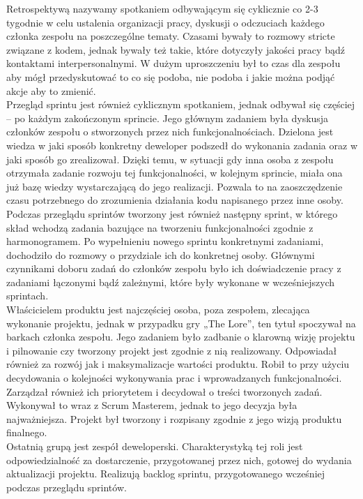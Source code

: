 \documentclass[oneside,polski,logo]{amuthesis}
\begin{document}
Retrospektywą nazywamy spotkaniem odbywającym się cyklicznie co 2-3 tygodnie w celu ustalenia organizacji pracy, dyskusji o odczuciach każdego członka zespołu na poszczególne tematy. Czasami bywały to rozmowy stricte związane z kodem, jednak bywały też takie, które dotyczyły jakości pracy bądź kontaktami interpersonalnymi. W dużym uproszczeniu był to czas dla zespołu aby mógł przedyskutować to co się podoba, nie podoba i jakie można podjąć akcje aby to zmienić. \\

Przegląd sprintu jest również cyklicznym spotkaniem, jednak odbywał się częściej – po każdym zakończonym sprincie. Jego głównym zadaniem była dyskusja członków zespołu o stworzonych przez nich funkcjonalnościach. Dzielona jest wiedza w jaki sposób konkretny deweloper podszedł do wykonania zadania oraz w jaki sposób go zrealizował. Dzięki temu, w sytuacji gdy inna osoba z zespołu otrzymała zadanie rozwoju tej funkcjonalności, w kolejnym sprincie, miała ona już bazę wiedzy wystarczającą do jego realizacji. Pozwala to na zaoszczędzenie czasu potrzebnego do zrozumienia działania kodu napisanego przez inne osoby. Podczas przeglądu sprintów tworzony jest również następny sprint, w którego skład wchodzą zadania bazujące na tworzeniu funkcjonalności zgodnie z harmonogramem. Po wypełnieniu nowego sprintu konkretnymi zadaniami, dochodziło do rozmowy o przydziale ich do konkretnej osoby. Głównymi czynnikami doboru zadań do członków zespołu było ich doświadczenie pracy z zadaniami łączonymi bądź zależnymi, które były wykonane w wcześniejszych sprintach. \\

Właścicielem produktu jest najczęściej osoba, poza zespołem, zlecająca wykonanie projektu, jednak w przypadku gry „The Lore”, ten tytuł spoczywał na barkach członka zespołu. Jego zadaniem było zadbanie o klarowną wizję projektu i pilnowanie czy tworzony projekt jest zgodnie z nią realizowany. Odpowiadał również za rozwój jak i maksymalizacje wartości produktu. Robił to przy użyciu decydowania o kolejności wykonywania prac i wprowadzanych funkcjonalności. Zarządzał również ich priorytetem i decydował o treści tworzonych zadań. Wykonywał to wraz z Scrum Masterem, jednak to jego decyzja była najważniejsza. Projekt był tworzony i rozpisany zgodnie z jego wizją produktu finalnego.\\

Ostatnią grupą jest zespół deweloperski. Charakterystyką tej roli jest odpowiedzialność za dostarczenie, przygotowanej przez nich, gotowej do wydania aktualizacji projektu. Realizują backlog sprintu, przygotowanego wcześniej podczas przeglądu sprintów.
\end{document}
